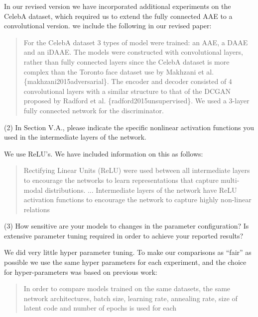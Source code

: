 \documentclass{article}
\begin{document}
{\color{red}
In our revised version we have incorporated additional experiments on the CelebA dataset, which required us to extend the fully connected AAE to a convolutional version. we include the following in our revised paper:

\begin{quote}
For the CelebA dataset $3$ types of model were trained: an AAE, a DAAE and an iDAAE. The models were constructed with convolutional layers, rather than fully connected layers since the CelebA dataset is more complex than the Toronto face dataset use by Makhzani et al. \{makhzani2015adversarial\}. The encoder and decoder consisted of $4$ convolutional layers with a similar structure to that of the DCGAN proposed by Radford et al. \{radford2015unsupervised\}. We used a $3$-layer fully connected network for the discriminator. 
\end{quote}

{\color{blue}
(2) In Section V.A., please indicate the specific nonlinear activation functions you used in the intermediate layers of the network.}\newline


We use ReLU's. We have included information on this as follows:
    \begin{quote}
        Rectifying Linear Units (ReLU) were used between all intermediate layers to encourage the networks to learn representations that capture multi-modal distributions. \newline
        ... \newline
        Intermediate layers of the network have ReLU activation functions to encourage the network to capture highly non-linear relations
    \end{quote}


{\color{blue}
(3) How sensitive are your models to changes in the parameter configuration? Is extensive parameter tuning required in order to achieve your reported results?}\newline


We did very little hyper parameter tuning. To make our comparisons as ``fair'' as possible we use the same hyper parameters for each experiment, and the choice for hyper-parameters was based on previous work:
    
    \begin{quote}
        In  order  to  compare  models trained on the same datasets, the same network architectures, batch size, learning rate, annealing rate, size of latent code and number of epochs is used for each
    \end{quote}

}
\end{document}
